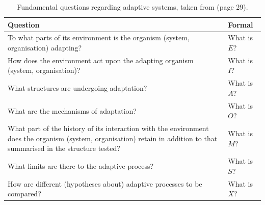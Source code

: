 \begin{table}[ht]
	\centering\small
		\begin{tabularx}{\textwidth}{Xl}
		\toprule
		\textbf{Question} & \textbf{Formal} \\ 
		\toprule
		To what parts of its environment is the organism (system, organisation) adapting? & What is $E$? \\ 
		\midrule
		How does the environment act upon the adapting organism (system, organisation)? & What is $I$? \\ 
		\midrule
		What structures are undergoing adaptation? & What is $A$? \\ 
		\midrule
		What are the mechanisms of adaptation? & What is $O$? \\ 
		\midrule
		What part of the history of its interaction with the environment does the organism (system, organisation) retain in addition to that summarised in the structure tested? & What is $M$? \\ 
		\midrule
		What limits are there to the adaptive process? & What is $S$? \\ 
		\midrule
		How are different (hypotheses about) adaptive processes to be compared? & What is $X$? \\ 
		\bottomrule
		\end{tabularx}	
	\caption{Fundamental questions regarding adaptive systems, taken from \cite{Holland1992} (page 29).}
	\label{tab:adaptsys:questions}
\end{table}

%
%
